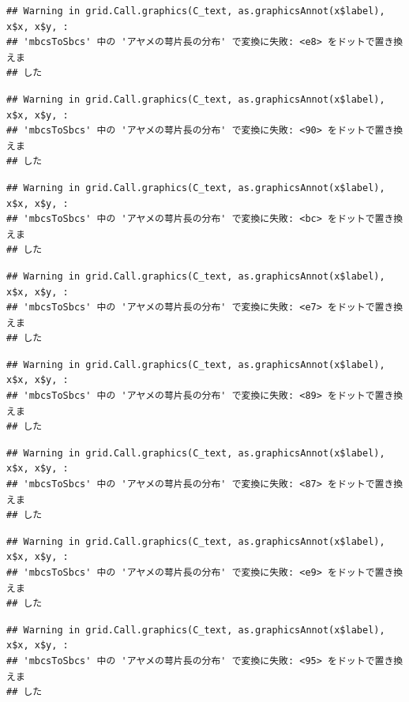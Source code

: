 \documentclass[
]{book}
\begin{document}
\begin{verbatim}
## Warning in grid.Call.graphics(C_text, as.graphicsAnnot(x$label), x$x, x$y, :
## 'mbcsToSbcs' 中の 'アヤメの萼片長の分布' で変換に失敗: <e8> をドットで置き換えま
## した
\end{verbatim}

\begin{verbatim}
## Warning in grid.Call.graphics(C_text, as.graphicsAnnot(x$label), x$x, x$y, :
## 'mbcsToSbcs' 中の 'アヤメの萼片長の分布' で変換に失敗: <90> をドットで置き換えま
## した
\end{verbatim}

\begin{verbatim}
## Warning in grid.Call.graphics(C_text, as.graphicsAnnot(x$label), x$x, x$y, :
## 'mbcsToSbcs' 中の 'アヤメの萼片長の分布' で変換に失敗: <bc> をドットで置き換えま
## した
\end{verbatim}

\begin{verbatim}
## Warning in grid.Call.graphics(C_text, as.graphicsAnnot(x$label), x$x, x$y, :
## 'mbcsToSbcs' 中の 'アヤメの萼片長の分布' で変換に失敗: <e7> をドットで置き換えま
## した
\end{verbatim}

\begin{verbatim}
## Warning in grid.Call.graphics(C_text, as.graphicsAnnot(x$label), x$x, x$y, :
## 'mbcsToSbcs' 中の 'アヤメの萼片長の分布' で変換に失敗: <89> をドットで置き換えま
## した
\end{verbatim}

\begin{verbatim}
## Warning in grid.Call.graphics(C_text, as.graphicsAnnot(x$label), x$x, x$y, :
## 'mbcsToSbcs' 中の 'アヤメの萼片長の分布' で変換に失敗: <87> をドットで置き換えま
## した
\end{verbatim}

\begin{verbatim}
## Warning in grid.Call.graphics(C_text, as.graphicsAnnot(x$label), x$x, x$y, :
## 'mbcsToSbcs' 中の 'アヤメの萼片長の分布' で変換に失敗: <e9> をドットで置き換えま
## した
\end{verbatim}

\begin{verbatim}
## Warning in grid.Call.graphics(C_text, as.graphicsAnnot(x$label), x$x, x$y, :
## 'mbcsToSbcs' 中の 'アヤメの萼片長の分布' で変換に失敗: <95> をドットで置き換えま
## した
\end{verbatim}
\end{document}
